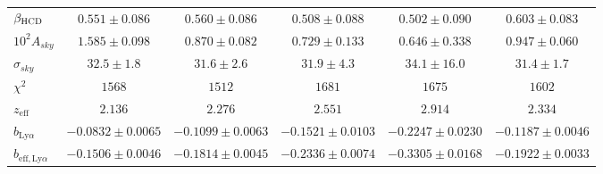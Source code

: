 \begin{table}[]
\begin{tabular}{lccccc}
$\beta_{\textsc{HCD}} $ & $ 0.551 \pm 0.086$ & $ 0.560 \pm 0.086$ & $ 0.508 \pm 0.088$ & $ 0.502 \pm 0.090$ & $ 0.603 \pm 0.083$ \\
$10^2 A_{sky} $ & $ 1.585 \pm 0.098$ & $ 0.870 \pm 0.082$ & $ 0.729 \pm 0.133$ & $ 0.646 \pm 0.338$ & $ 0.947 \pm 0.060$ \\
$\sigma_{sky} $ & $ 32.5 \pm 1.8$ & $ 31.6 \pm 2.6$ & $ 31.9 \pm 4.3$ & $ 34.1 \pm 16.0$ & $ 31.4 \pm 1.7$ \\
\midrule
$\chi^2$ & $ 1568 $ & $ 1512 $ & $ 1681 $ & $ 1675 $ & $ 1602 $ \\
$z_{\mathrm{eff}}$ & $ 2.136 $ & $ 2.276 $ & $ 2.551 $ & $ 2.914 $ & $ 2.334 $ \\
\midrule
$b_{\mathrm{Ly}\alpha} $ & $ -0.0832 \pm 0.0065$ & $ -0.1099 \pm 0.0063$ & $ -0.1521 \pm 0.0103$ & $ -0.2247 \pm 0.0230$ & $ -0.1187 \pm 0.0046$ \\
$b_{\mathrm{eff}, \mathrm{Ly}\alpha} $ & $ -0.1506 \pm 0.0046$ & $ -0.1814 \pm 0.0045$ & $ -0.2336 \pm 0.0074$ & $ -0.3305 \pm 0.0168$ & $ -0.1922 \pm 0.0033$ \\
\bottomrule
\end{tabular}
\end{table}


